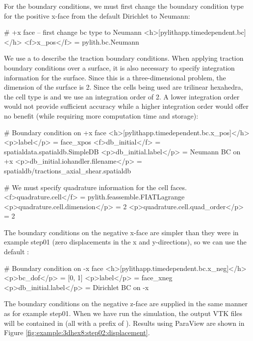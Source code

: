 For the boundary conditions, we must first change the boundary condition
type for the positive x-face from the default Dirichlet to Neumann:
\begin{cfg}
# +x face -- first change bc type to Neumann
<h>[pylithapp.timedependent.bc]</h>
<f>x_pos</f> = pylith.bc.Neumann 
\end{cfg}
We use a  to describe the traction boundary
conditions.  When applying traction boundary conditions over a
surface, it is also necessary to specify integration information for
the surface. Since this is a three-dimensional problem, the dimension
of the surface is 2. Since the cells being used are trilinear
hexahedra, the cell type is  and we use an
integration order of 2.  A lower integration order would not provide
sufficient accuracy while a higher integration order would offer no
benefit (while requiring more computation time and storage):
\begin{cfg}
# Boundary condition on +x face
<h>[pylithapp.timedependent.bc.x_pos]</h>
<p>label</p> = face_xpos
<f>db_initial</f> = spatialdata.spatialdb.SimpleDB
<p>db_initial.label</p> = Neumann BC on +x
<p>db_initial.iohandler.filename</p> = spatialdb/tractions_axial_shear.spatialdb

# We must specify quadrature information for the cell faces.
<f>quadrature.cell</f> = pylith.feassemble.FIATLagrange
<p>quadrature.cell.dimension</p> = 2
<p>quadrature.cell.quad_order</p> = 2 
\end{cfg}
The boundary conditions on the negative x-face are simpler than they
were in example step01 (zero displacements in the x and y-directions),
so we can use the default :
\begin{cfg}
# Boundary condition on -x face
<h>[pylithapp.timedependent.bc.x_neg]</h>
<p>bc_dof</p> = [0, 1] 
<p>label</p> = face_xneg
<p>db_initial.label</p> = Dirichlet BC on -x 
\end{cfg}
The boundary conditions on the negative z-face are supplied in the
same manner as for example step01. When we have run the simulation,
the output VTK files will be contained in 
(all with a prefix of ). Results using ParaView are
shown in Figure \vref{fig:example:3dhex8:step02:displacement}.

